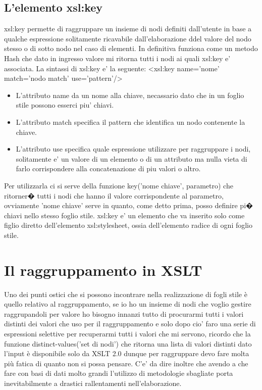 \documentclass[11pt,titlepage,a4paper,twoside,openany]{book}
\begin{document}
\subsection{L'elemento xsl:key}
xsl:key permette di raggruppare un insieme di nodi definiti dall'utente in base a qualche espressione solitamente ricavabile dall'elaborazione ddel valore del nodo stesso o di sotto nodo nel caso di elementi. In definitiva funziona come un metodo Hash che dato in ingresso valore mi ritorna tutti i nodi ai quali xsl:key e' associata.
La sintassi di xsl:key e' la seguente:
<xsl:key name='nome' match='nodo match' use='pattern'/>
\begin{itemize}
\item L'attributo name da un nome alla chiave, necassario dato che in un foglio stile possono esserci piu' chiavi.
\item L'attributo match specifica il pattern che identifica un nodo contenente la chiave.
\item L'attributo use specifica quale espressione utilizzare per raggruppare i nodi, solitamente e' un valore di un elemento o di un attributo ma nulla vieta di farlo corrispondere alla concatenazione di piu valori o altro.
\end{itemize}

Per utilizzarla ci si serve della funzione key('nome chiave', parametro) che ritorner� tutti i nodi che hanno il valore corrispondente al parametro, ovviamente 'nome chiave' serve in quanto, come detto prima, posso definire pi� chiavi nello stesso foglio stile.
xsl:key e' un elemento che va inserito solo come figlio diretto dell'elemento xsl:stylesheet, ossia dell'elemento radice di ogni foglio stile.

\section{Il raggruppamento in XSLT}
Uno dei punti ostici che si possono incontrare nella realizzazione di fogli stile \`e quello relativo al raggruppamento, se io ho un insieme di nodi che voglio gestire raggrupandoli per valore ho bisogno innanzi tutto di procurarmi tutti i valori distinti dei valori che uso per il raggruppamento e solo dopo cio' faro una serie di espressioni selettive per recuperarmi tutti i valori che mi servono, ricordo che la funzione distinct-values('set di nodi') che ritorna una lista di valori distinti dato l'input \`e disponibile solo da XSLT 2.0 dunque per raggruppare devo fare molta pi\`u fatica di quanto non si possa pensare.
C'e' da dire inoltre che avendo a che fare con basi di dati molto grandi l'utilizzo di metodologie sbagliate porta inevitabilmente a drastici rallentamenti nell'elaborazione.
\end{document}
